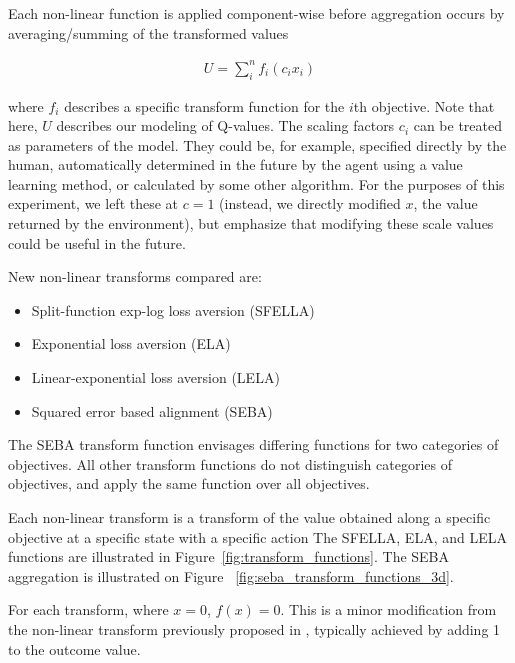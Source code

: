 Each non-linear function is applied component-wise before aggregation occurs by averaging/summing of the transformed values

\begin{align}
\label{eq:meu}
U=\sum_{i}^n{f_i(c_i x_i)}
\end{align}

\noindent where ${f_i}$ describes a specific transform function for the $i$th objective. Note that here, $U$ describes our modeling of Q-values. The scaling factors $c_i$ can be treated as parameters of the model. They could be, for example, specified directly by the human, automatically determined in the future by the agent using a value learning method, or calculated by some other algorithm. 
For the purposes of this experiment, we left these at $c=1$ (instead, we directly modified $x$, the value returned by the environment), but emphasize that modifying these scale values could be useful in the future.


 New non-linear transforms compared are:

\begin{itemize}
    \item Split-function exp-log loss aversion (SFELLA)
    \item Exponential loss aversion (ELA)
    \item Linear-exponential loss aversion (LELA)
    \item Squared error based alignment (SEBA)
\end{itemize}

\noindent The SEBA transform function envisages differing functions for two categories of objectives. All other transform functions do not distinguish categories of objectives, and apply the same function over all objectives.

Each non-linear transform is a transform of the value obtained along a specific objective %
at a specific state %
with a specific action %
The SFELLA, ELA, and LELA functions are illustrated in Figure~\ref{fig:transform_functions}. The SEBA aggregation is illustrated on Figure ~\ref{fig:seba_transform_functions_3d}.

For each transform, where $x=0$, $f(x)=0$. This is a minor modification from the non-linear transform previously proposed in \cite{rolf_need_2020}, typically achieved by adding 1 to the outcome value.

